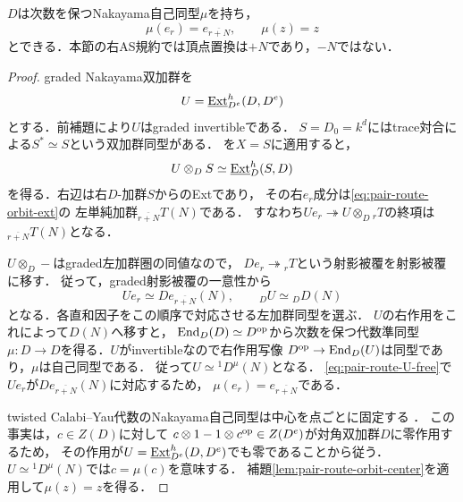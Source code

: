 \begin{lemma}
\label{lem:pair-route-nakayama}
$D$は次数を保つNakayama自己同型$\mu$を持ち，
\begin{equation}\label{eq:pair-route-mu-vertices}
 \mu(e_r)=e_{\overline{r+N}},\qquad \mu(z)=z
\end{equation}
とできる．本節の右AS規約では頂点置換は$+N$であり，$-N$ではない．
\end{lemma}
\begin{proof}
graded Nakayama双加群を
\begin{equation}
 U=\underline{\operatorname{Ext}}^{h}_{D^e}(D,D^e)
\end{equation}
とする．前補題により$U$はgraded invertibleである．
$S=D_0=k^d$にはtrace対合による$S^*\simeq S$という双加群同型がある．
\cite[Lemma~5.9(1)]{RRGeneralizedAS}を$X=S$に適用すると，
\begin{equation}\label{eq:pair-route-U-top}
 U\otimes_D S\simeq
 \underline{\operatorname{Ext}}^{h}_{D}(S,D)
\end{equation}
を得る．右辺は右$D$-加群$S$からのExtであり，
その右$e_r$成分は\eqref{eq:pair-route-orbit-ext}の
左単純加群${}_{\overline{r+N}}T(N)$である．
すなわち$Ue_r\twoheadrightarrow U\otimes_D {}_rT$の終項は
${}_{\overline{r+N}}T(N)$となる．

$U\otimes_D-$はgraded左加群圏の同値なので，
$De_r\twoheadrightarrow{}_rT$という射影被覆を射影被覆に移す．
従って，graded射影被覆の一意性から
\begin{equation}\label{eq:pair-route-U-free}
 Ue_r\simeq De_{\overline{r+N}}(N),\qquad
 {}_DU\simeq {}_DD(N)
\end{equation}
となる．各直和因子をこの順序で対応させる左加群同型を選ぶ．
$U$の右作用をこれによって$D(N)$へ移すと，
$\operatorname{End}_D(D)\simeq D^{\rm op}$から次数を保つ代数準同型
$\mu:D\to D$を得る．$U$がinvertibleなので右作用写像
$D^{\rm op}\to\operatorname{End}_D(U)$は同型であり，$\mu$は自己同型である．
従って$U\simeq {}^1D^\mu(N)$となる．
\eqref{eq:pair-route-U-free}で$Ue_r$が$De_{\overline{r+N}}(N)$に対応するため，
$\mu(e_r)=e_{\overline{r+N}}$である．

twisted Calabi--Yau代数のNakayama自己同型は中心を点ごとに固定する
\cite[Lemma~4.5]{RRGeneralizedAS}．
この事実は，$c\in Z(D)$に対して
$c\otimes1-1\otimes c^{\rm op}\in Z(D^e)$が対角双加群$D$に零作用するため，
その作用が$U=\underline{\operatorname{Ext}}^{h}_{D^e}(D,D^e)$でも零であることから従う．
$U\simeq{}^1D^\mu(N)$では$c=\mu(c)$を意味する．
補題\ref{lem:pair-route-orbit-center}を適用して$\mu(z)=z$を得る．
\end{proof}

